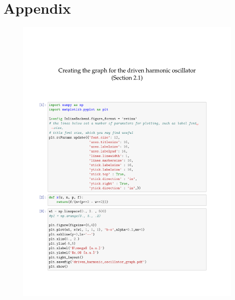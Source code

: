\documentclass[12pt]{article}
\begin{document}
\section{Appendix}
\begin{figure}[hbt]
	\includegraphics[width=.96\textwidth]{code/python_code_c4.pdf}
\end{figure}
\clearpage



\end{document}
